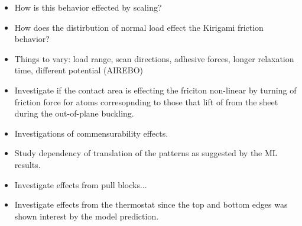 \begin{itemize}
  \item How is this behavior effected by scaling?
  \item How does the distirbution of normal load effect the Kirigami friction behavior?
  \item Things to vary: load range, scan directions, adhesive forces, longer relaxation time, different potential (AIREBO)
  \item Investigate if the contact area is effecting the friciton non-linear by turning of friction force for atoms corresopnding to those that lift of from the sheet during the out-of-plane buckling. 
  \item Investigations of commensurability effects.
  \item Study dependency of translation of the patterns as suggested by the ML results. 
  \item Investigate effects from pull blocks...
  \item Investigate effects from the thermostat since the top and bottom edges was shown interest by the model prediction.
\end{itemize}

